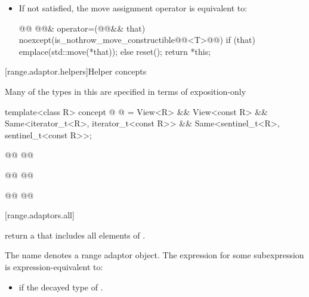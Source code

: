 {\begin{itemize}
\item If 
   not satisfied,
the move assignment operator is equivalent to:
\begin{codeblock}
@@ @@& operator=(@@&& that)
  noexcept(is_nothrow_move_constructible@@<T>@@)
{
  if (that) emplace(std::move(*that));
  else reset();
  return *this;
}
\end{codeblock}
\end{itemize}

[range.adaptor.helpers]{Helper concepts}

\pnum
Many of the types in this   are specified in
terms of   exposition-only 

\begin{codeblock}
template<class R>
concept @ @ =
  View<R> && View<const R> &&
  Same<iterator_t<R>, iterator_t<const R>> &&
  Same<sentinel_t<R>, sentinel_t<const R>>;

@@
  @@

@@
  @@

@@
@@
\end{codeblock}

[range.adaptors.all]{}

\pnum
{}   return a
 that includes all elements of  
  .

\pnum
The name  denotes a range adaptor
object. The expression  for
some subexpression  is expression-equivalent to:

\begin{itemize}
\item {} if the decayed type of 
  .


\end{itemize}}
